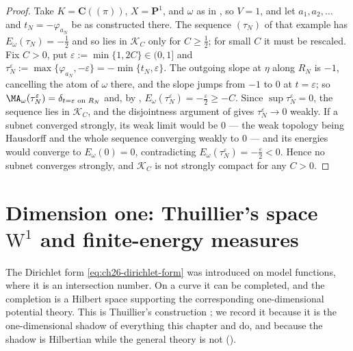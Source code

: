 \begin{proof}
Take $K=\mathbf C((\pi))$, $X=\mathbf P^1$, and $\omega$ as in
, so $V=1$, and let $a_1,a_2,\ldots$ and
$t_N=-\varphi_{a_N}$ be as constructed there.  The sequence
$(\tau_N)$ of that example has $E_\omega(\tau_N)=-\tfrac12$ and so lies
in $\mathcal K_C$ only for $C\geq\tfrac12$; for small $C$ it must be
rescaled.  Fix $C>0$, put $\varepsilon:=\min\{1,2C\}\in(0,1]$ and
$\tau_N^\varepsilon:=\max\{\varphi_{a_N},-\varepsilon\}
 =-\min\{t_N,\varepsilon\}$.  The outgoing slope at $\eta$ along $R_N$
is $-1$, cancelling the atom of $\omega$ there, and the slope jumps from
$-1$ to $0$ at $t=\varepsilon$; so
$\MA_\omega(\tau_N^\varepsilon)=\delta_{t=\varepsilon\text{ on }R_N}$ and,
by ,
$E_\omega(\tau_N^\varepsilon)=-\tfrac\varepsilon2\geq-C$.  Since
$\sup\tau_N^\varepsilon=0$, the sequence lies in $\mathcal K_C$, and the
disjointness argument of  gives
$\tau_N^\varepsilon\to0$ weakly.  If a subnet converged
strongly, its weak limit would be $0$ --- the weak topology being Hausdorff
and the whole sequence converging weakly to $0$ --- and its energies would
converge to $E_\omega(0)=0$, contradicting
$E_\omega(\tau_N^\varepsilon)=-\tfrac\varepsilon2<0$.  Hence no subnet converges strongly, and
$\mathcal K_C$ is not strongly compact for any $C>0$.
\end{proof}

\section{Dimension one: Thuillier's space
\texorpdfstring{$\mathrm W^1$}{W1} and finite-energy measures}
\label{sec:ch26-thuillier}

The Dirichlet form \eqref{eq:ch26-dirichlet-form} was introduced on model
functions, where it is an intersection number.  On a curve it can be
completed, and the completion is a Hilbert space supporting the corresponding
one-dimensional potential theory.  This is Thuillier's construction
\cite[\S3.5]{Thu05}; we record it because it is the one-dimensional shadow
of everything this chapter and
 do, and because the shadow is
Hilbertian while the general theory is not
().

